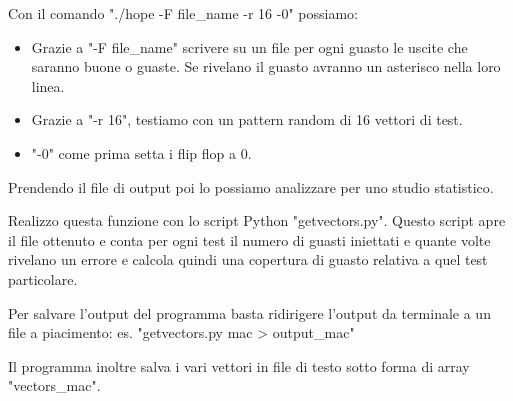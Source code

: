 \documentclass[12pt, letterpaper]{article}
\begin{document}
Con il comando "./hope -F {file\_name} -r 16 -0" possiamo:

\begin{itemize}
\item Grazie a "-F {file\_name}" scrivere su un file per ogni guasto le uscite che saranno buone o guaste. Se rivelano il guasto avranno un asterisco nella loro linea.
\item Grazie a "-r 16", testiamo con un pattern random di 16 vettori di test.
\item "-0" come prima setta i flip flop a 0.
\end{itemize}

Prendendo il file di output poi lo possiamo analizzare per uno studio statistico.

Realizzo questa funzione con lo script Python "getvectors.py".
Questo script apre il file ottenuto e conta per ogni test il numero di guasti iniettati e quante volte rivelano un errore e calcola quindi una copertura di guasto relativa a quel test particolare.

Per salvare l'output del programma basta ridirigere l'output da terminale a un file a piacimento: es. "getvectors.py mac > output\_mac"

Il programma inoltre salva i vari vettori in file di testo sotto forma di array "vectors\_mac".
\end{document}
